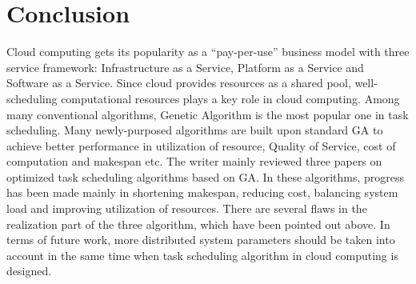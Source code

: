 \documentclass[10pt,twoside,openright,logo]{report}
\begin{document}
\chapter{Conclusion}
Cloud computing gets its popularity as a “pay-per-use” business model with three service framework: Infrastructure as a Service, Platform as a Service and Software as a Service. Since cloud provides resources as a shared pool, well-scheduling computational resources plays a key role in cloud computing. Among many conventional algorithms, Genetic Algorithm is the most popular one in task scheduling. Many newly-purposed algorithms are built upon standard GA to achieve better performance in utilization of resource, Quality of Service, cost of computation and makespan etc. The writer mainly reviewed three papers on optimized task scheduling algorithms based on GA. In these algorithms, progress has been made mainly in shortening makespan, reducing cost, balancing system load and improving utilization of resources. There are several flaws in the realization part of the three algorithm, which have been pointed out above. In terms of future work, more distributed system parameters should be taken into account in the same time when task scheduling algorithm in cloud computing is designed.


\end{document}
